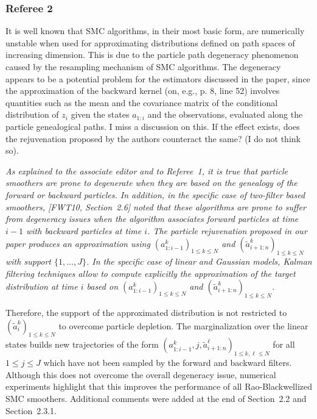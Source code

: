\vspace{.2cm}



\subsubsection*{Referee 2}
\noindent It is well known that SMC algorithms, in their most basic form, are numerically unstable
when used for approximating distributions defined on path spaces of increasing dimension. This is due to the particle path degeneracy phenomenon caused by the resampling mechanism of SMC algorithms. The degeneracy appears to be a potential problem for the estimators discussed in the paper, since the approximation of the
backward kernel (on, e.g., p. 8, line 52) involves quantities such as the mean and the
covariance matrix of the conditional distribution of $z_i$ given the states $a_{1:i}$ and the observations,
evaluated along the particle genealogical paths. I miss a discussion on this. If the effect exists, does the rejuvenation proposed by the authors counteract the same? (I do not think so).

\vspace{.2cm}
{\em
\noindent As explained to the associate editor and to  Referee~1, it is true that particle smoothers are prone to degenerate when they are based on  the genealogy of the forward or backward particles. In addition, in the specific case of two-filter based smoothers, [FWT10, Section~2.6] noted that these algorithms are prone to suffer from degeneracy issues when the algorithm associates forward particles at time $i-1$ with backward particles at time $i$. 
The particle rejuvenation proposed in our paper produces an approximation using $(a^k_{1:i-1})_{1\le k \le N}$ and $(\tilde{a}^k_{i+1:n})_{1\le k \le N}$ with support $\{1,\ldots,J\}$. In the specific case of linear and Gaussian models, Kalman filtering techniques allow to compute explicitly the approximation of the target distribution at time $i$ based on  $(a^k_{1:i-1})_{1\le k \le N}$ and $(\tilde{a}^k_{i+1:n})_{1\le k \le N}$. 

Therefore, the support of the approximated distribution is not restricted to $(\tilde{a}^k_{i})_{1\le k \le N}$ to overcome particle depletion. The marginalization over the linear states  builds new trajectories of the form $(a^k_{1:i-1},j,\tilde{a}^\ell_{i+1:n})_{1\le k,\ell \le N}$ for all $1\le j \le J$ which have not been sampled by the forward and backward filters. Although this does not overcome the overall degeneracy issue, numerical experiments highlight that this improves the performance of all Rao-Blackwellized SMC smoothers. Additional comments were added at the end of Section~2.2 and Section~2.3.1.
}


